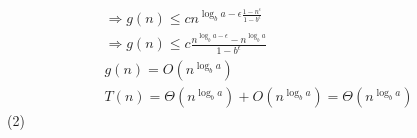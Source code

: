$$\begin{array}{l}
    \Rightarrow g(n) \leq c n^{\log _{b} a-\epsilon \frac{1-n^{\epsilon}}{1-b^{\epsilon}}}                                                                                                                   \\
    \Rightarrow g(n) \leq c \frac{n^{\log _{b} a-\epsilon}-n^{\log _{b} a}}{1-b^{\epsilon}}                                                                                                                  \\
    g(n)=O\left(n^{\log _{b} a}\right)                                                                                                                                                                       \\
    T(n)=\Theta\left(n^{\log _{b} a}\right)+O\left(n^{\log _{b} a}\right)=\Theta\left(n^{\log _{b} a}\right)
  \end{array}
$$
(2)
